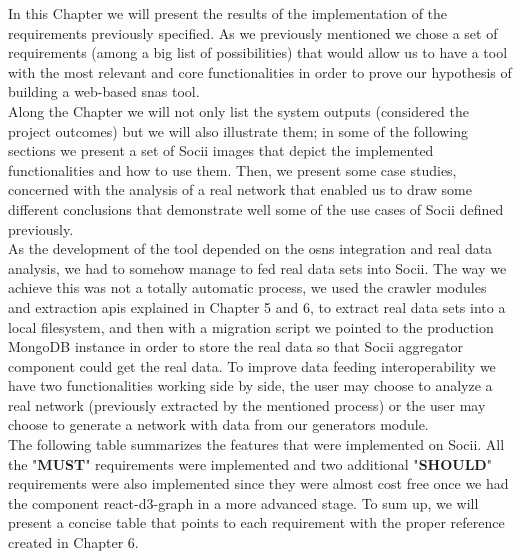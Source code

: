 In this Chapter we will present the results of the implementation of the requirements previously specified. As we previously mentioned we chose a set of requirements (among a big list of possibilities) that would allow us to have a tool with the most relevant and core functionalities
in order to prove our hypothesis of building a web-based \glspl{sna} tool.\\
\indent Along the Chapter we will not only list the system outputs (considered the project outcomes) but we will also illustrate them; in some of the following sections we present a set of Socii images that depict the implemented functionalities and how to use them. Then, we present some case studies, concerned with the analysis of a real network that enabled us to draw some different conclusions that demonstrate well some of the use cases of Socii defined previously.\\

\indent As the development of the tool depended on the \glspl{osn} integration and real data analysis, we had to somehow manage to fed real data sets into
Socii. The way we achieve this was not a totally automatic process, we used the crawler modules and extraction \glspl{api} explained in Chapter 5 and 6, to extract real data sets into a local filesystem, and then with a migration script we pointed to the production MongoDB instance in order to store the real data so that Socii aggregator component could get the real data. To improve data feeding interoperability we have two functionalities working side by side, the user may choose to analyze a real network (previously extracted by the mentioned process) or the user may choose to generate a network with data from our generators module.\\

\indent The following table summarizes the features that were implemented on Socii. All the "\textbf{MUST}" requirements were implemented
and two additional "\textbf{SHOULD}" requirements were also implemented since they were almost cost free once we had the
component react-d3-graph in a more advanced stage. To sum up, we will present a concise table that points to
each requirement with the proper reference created in Chapter 6.

